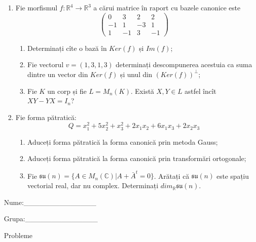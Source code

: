 \documentclass{article}
\begin{document}
\begin{enumerate}
 \item Fie morfismul $f:\mathbb{R}^4 \to \mathbb{R}^3$ a cărui matrice în raport cu bazele canonice este
$$\begin{pmatrix}
0&3&2&2\\
-1&1&-3&1\\
1&-1&3&-1
\end{pmatrix}$$

\begin{enumerate}
\item Determinați cîte o bază în $Ker(f)$ și $Im(f)$;
\item Fie vectorul $v=(1,3,1,3)$ determinați descompunerea acestuia ca suma dintre un vector din $Ker(f)$ și unul din $(Ker(f))^\perp$;
\item Fie $K$ un corp și fie $L=M_n(K)$. Există $X,Y \in L$ astfel încît $XY-YX=I_n$?  
\end{enumerate}
\item Fie forma pătratică:
$$Q= x_1^2+5x_2^2+x_3^2+2x_1x_2+6x_1x_3+2x_2x_3$$

\begin{enumerate}
\item Aduceți forma pătratică la forma canonică prin metoda Gauss;
\item Aduceți forma pătratică la forma canonică prin transformări ortogonale;
\item Fie $\mathfrak{su}(n)=\{ A \in M_n(\mathbb{C}) | A+\bar{A}^t=0\}$. Arătați că $\mathfrak{su}(n)$ este spațiu vectorial real, dar nu complex.
Determinați $dim_{\mathbb{R}}\mathfrak{su}(n)$.
\end{enumerate}
\end{enumerate}
\newpage
\begin{flushright}
Nume:\_\_\_\_\_\_\_\_\_\_\_\_\_\_
 
 
Grupa:\_\_\_\_\_\_\_\_\_\_\_\_\_\_
\end{flushright}
\begin{center}
\vspace{2cm}
{\Large Probleme}
\vspace{2cm}
\end{center}
\end{document}
